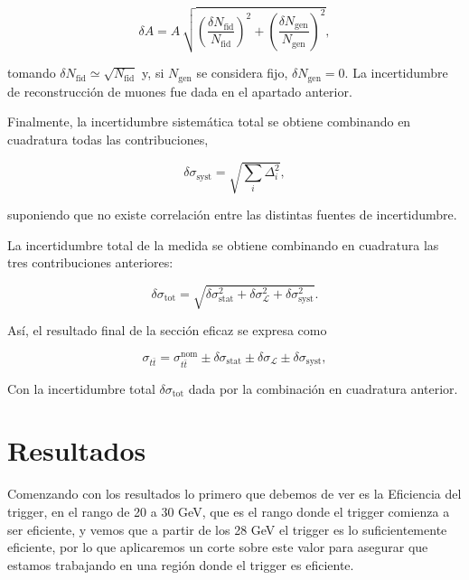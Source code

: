 \documentclass[9pt,a4paper,twocolumn,twoside]{rho-class/rho}
\begin{document}
\begin{equation}
    \delta A = A\,\sqrt{\left(\frac{\delta N_{\mathrm{fid}}}{N_{\mathrm{fid}}}\right)^2 + \left(\frac{\delta N_{\mathrm{gen}}}{N_{\mathrm{gen}}}\right)^2},
\end{equation}

tomando $\delta N_{\mathrm{fid}} \simeq \sqrt{N_{\mathrm{fid}}}$ y, si $N_{\mathrm{gen}}$ se considera fijo, $\delta N_{\mathrm{gen}} = 0$. La incertidumbre de reconstrucción de muones fue dada en el apartado anterior.

Finalmente, la incertidumbre sistemática total se obtiene combinando en cuadratura todas las contribuciones,

\begin{equation}
    \delta \sigma_{\mathrm{syst}} = \sqrt{\sum_i \Delta_i^2},
\end{equation}

suponiendo que no existe correlación entre las distintas fuentes de incertidumbre.

La incertidumbre total de la medida se obtiene combinando en cuadratura las tres contribuciones anteriores:

\begin{equation}
    \delta \sigma_{\mathrm{tot}} = \sqrt{\delta \sigma_{\mathrm{stat}}^2 + \delta \sigma_{\mathcal{L}}^2 + \delta \sigma_{\mathrm{syst}}^2}.
\end{equation}

Así, el resultado final de la sección eficaz se expresa como

\begin{equation}
    \sigma_{t\bar{t}} = \sigma_{t\bar{t}}^{\mathrm{nom}} \pm \delta \sigma_{\mathrm{stat}} \pm \delta \sigma_{\mathcal{L}} \pm \delta \sigma_{\mathrm{syst}},
\end{equation}

Con la incertidumbre total $\delta \sigma_{\mathrm{tot}}$ dada por la combinación en cuadratura anterior.

\section{Resultados}

Comenzando con los resultados lo primero que debemos de ver es la Eficiencia del trigger, en el rango de 20 a 30 GeV, que es el rango donde el trigger comienza a ser eficiente, y vemos que a partir de los 28 GeV el trigger es lo suficientemente eficiente, por lo que aplicaremos un corte sobre este valor para asegurar que estamos trabajando en una región donde el trigger es eficiente.
\end{document}
